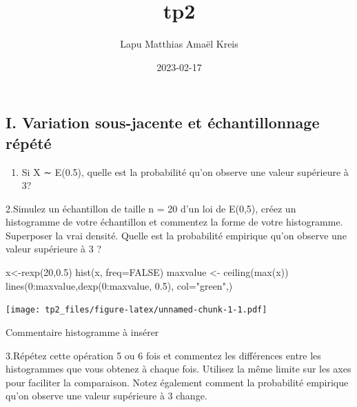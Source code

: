 \documentclass[
]{article}
\title{tp2}
\author{Lapu Matthias \textbar{} Amaël Kreis}
\date{2023-02-17}
\newenvironment{Shaded}{\begin{snugshade}}{\end{snugshade}}
\newcommand{\AttributeTok}[1]{\textcolor[rgb]{0.77,0.63,0.00}{#1}}
\newcommand{\ConstantTok}[1]{\textcolor[rgb]{0.00,0.00,0.00}{#1}}
\newcommand{\DecValTok}[1]{\textcolor[rgb]{0.00,0.00,0.81}{#1}}
\newcommand{\FloatTok}[1]{\textcolor[rgb]{0.00,0.00,0.81}{#1}}
\newcommand{\FunctionTok}[1]{\textcolor[rgb]{0.00,0.00,0.00}{#1}}
\newcommand{\NormalTok}[1]{#1}
\newcommand{\OtherTok}[1]{\textcolor[rgb]{0.56,0.35,0.01}{#1}}
\newcommand{\SpecialCharTok}[1]{\textcolor[rgb]{0.00,0.00,0.00}{#1}}
\newcommand{\StringTok}[1]{\textcolor[rgb]{0.31,0.60,0.02}{#1}}
\providecommand{\tightlist}{%
  \setlength{\itemsep}{0pt}\setlength{\parskip}{0pt}}
\begin{document}
\maketitle

\hypertarget{i.-variation-sous-jacente-et-uxe9chantillonnage-ruxe9puxe9tuxe9}{%
\subsection{I. Variation sous-jacente et échantillonnage
répété}\label{i.-variation-sous-jacente-et-uxe9chantillonnage-ruxe9puxe9tuxe9}}

\begin{enumerate}
\def\labelenumi{\arabic{enumi}.}
\tightlist
\item
  Si X ∼ E(0.5), quelle est la probabilité qu'on observe une valeur
  supérieure à 3?
\end{enumerate}

2.Simulez un échantillon de taille n = 20 d'un loi de E(0,5), créez un
histogramme de votre échantillon et commentez la forme de votre
histogramme. Superposer la vrai densité. Quelle est la probabilité
empirique qu'on observe une valeur supérieure à 3 ?

\begin{Shaded}
\begin{Highlighting}[]
\NormalTok{x}\OtherTok{\textless{}{-}}\FunctionTok{rexp}\NormalTok{(}\DecValTok{20}\NormalTok{,}\FloatTok{0.5}\NormalTok{)}
\FunctionTok{hist}\NormalTok{(x, }\AttributeTok{freq=}\ConstantTok{FALSE}\NormalTok{)}
\NormalTok{maxvalue }\OtherTok{\textless{}{-}} \FunctionTok{ceiling}\NormalTok{(}\FunctionTok{max}\NormalTok{(x))}
\FunctionTok{lines}\NormalTok{(}\DecValTok{0}\SpecialCharTok{:}\NormalTok{maxvalue,}\FunctionTok{dexp}\NormalTok{(}\DecValTok{0}\SpecialCharTok{:}\NormalTok{maxvalue, }\FloatTok{0.5}\NormalTok{), }\AttributeTok{col=}\StringTok{"green"}\NormalTok{,)}
\end{Highlighting}
\end{Shaded}

\texttt{[image: tp2\_files/figure-latex/unnamed-chunk-1-1.pdf]}

Commentaire histogramme à insérer

3.Répétez cette opération 5 ou 6 fois et commentez les différences entre
les histogrammes que vous obtenez à chaque fois. Utilisez la même limite
sur les axes pour faciliter la comparaison. Notez également comment la
probabilité empirique qu'on observe une valeur supérieure à 3 change.
\end{document}
